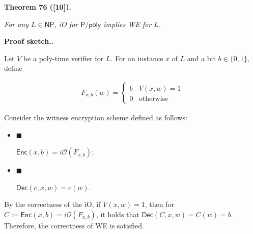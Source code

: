 



\par\medskip\noindent\textbf{
\textbf{Theorem 76}\textbf{ }([10])\textbf{.}
}\par



\emph{For any $L\in{\mathsf{NP}}$, iO for ${\mathsf{P}}/{\mathsf{poly}}$ implies WE for $L$.}\par






\par\medskip\noindent\textbf{Proof sketch..}\par




Let $V$ be a poly-time verifier for $L$. For an instance $x$ of $L$ and a bit $b\in\{0,1\}$, define\par


\[\begin{gathered}
F_{x,b}(w)=\begin{cases}b&V(x,w)=1\\
0&\text{otherwise}\end{cases}
\end{gathered}\]


Consider the witness encryption scheme defined as follows:\par


\begin{itemize}


\item[] 
$\blacksquare$ 


${\mathsf{Enc}}(x,b)=i\mathcal{O}(F_{x,b})$;\par





\item[] 
$\blacksquare$ 


${\mathsf{Dec}}(c,x,w)=c(w)$.\par





\end{itemize}


By the correctness of the iO, if $V(x,w)=1$, then for $C:={\mathsf{Enc}}(x,b)=i\mathcal{O}(F_{x,b})$, it holds that ${\mathsf{Dec}}(C,x,w)=C(w)=b$. Therefore, the correctness of WE is satisfied.\par




